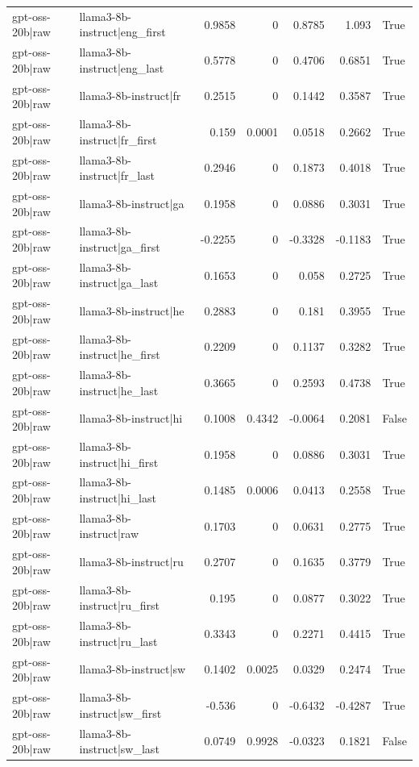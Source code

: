 \begin{table}
\begin{tabular}{l l r r r r l}
gpt-oss-20b|raw & llama3-8b-instruct|eng_first & 0.9858 & 0 & 0.8785 & 1.093 & True \\
gpt-oss-20b|raw & llama3-8b-instruct|eng_last & 0.5778 & 0 & 0.4706 & 0.6851 & True \\
gpt-oss-20b|raw & llama3-8b-instruct|fr & 0.2515 & 0 & 0.1442 & 0.3587 & True \\
gpt-oss-20b|raw & llama3-8b-instruct|fr_first & 0.159 & 0.0001 & 0.0518 & 0.2662 & True \\
gpt-oss-20b|raw & llama3-8b-instruct|fr_last & 0.2946 & 0 & 0.1873 & 0.4018 & True \\
gpt-oss-20b|raw & llama3-8b-instruct|ga & 0.1958 & 0 & 0.0886 & 0.3031 & True \\
gpt-oss-20b|raw & llama3-8b-instruct|ga_first & -0.2255 & 0 & -0.3328 & -0.1183 & True \\
gpt-oss-20b|raw & llama3-8b-instruct|ga_last & 0.1653 & 0 & 0.058 & 0.2725 & True \\
gpt-oss-20b|raw & llama3-8b-instruct|he & 0.2883 & 0 & 0.181 & 0.3955 & True \\
gpt-oss-20b|raw & llama3-8b-instruct|he_first & 0.2209 & 0 & 0.1137 & 0.3282 & True \\
gpt-oss-20b|raw & llama3-8b-instruct|he_last & 0.3665 & 0 & 0.2593 & 0.4738 & True \\
gpt-oss-20b|raw & llama3-8b-instruct|hi & 0.1008 & 0.4342 & -0.0064 & 0.2081 & False \\
gpt-oss-20b|raw & llama3-8b-instruct|hi_first & 0.1958 & 0 & 0.0886 & 0.3031 & True \\
gpt-oss-20b|raw & llama3-8b-instruct|hi_last & 0.1485 & 0.0006 & 0.0413 & 0.2558 & True \\
gpt-oss-20b|raw & llama3-8b-instruct|raw & 0.1703 & 0 & 0.0631 & 0.2775 & True \\
gpt-oss-20b|raw & llama3-8b-instruct|ru & 0.2707 & 0 & 0.1635 & 0.3779 & True \\
gpt-oss-20b|raw & llama3-8b-instruct|ru_first & 0.195 & 0 & 0.0877 & 0.3022 & True \\
gpt-oss-20b|raw & llama3-8b-instruct|ru_last & 0.3343 & 0 & 0.2271 & 0.4415 & True \\
gpt-oss-20b|raw & llama3-8b-instruct|sw & 0.1402 & 0.0025 & 0.0329 & 0.2474 & True \\
gpt-oss-20b|raw & llama3-8b-instruct|sw_first & -0.536 & 0 & -0.6432 & -0.4287 & True \\
gpt-oss-20b|raw & llama3-8b-instruct|sw_last & 0.0749 & 0.9928 & -0.0323 & 0.1821 & False \\

\end{tabular}
\end{table}
